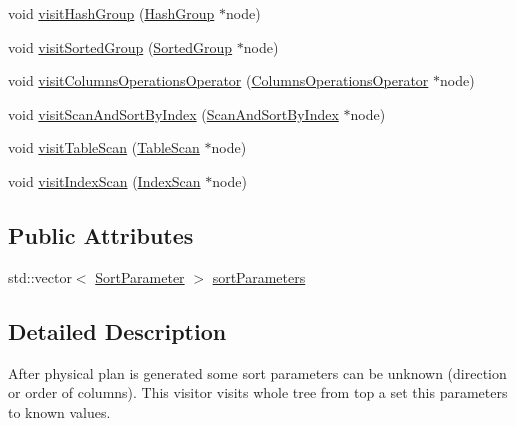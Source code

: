 \begin{DoxyCompactItemize}
\item 
void \hyperlink{classrafe_1_1_sort_resolving_physical_operator_visitor_ab2ed3da0ba8c7ba6c6f57af128b93979}{visit\+Hash\+Group} (\hyperlink{classrafe_1_1_hash_group}{Hash\+Group} $\ast$node)
\item 
void \hyperlink{classrafe_1_1_sort_resolving_physical_operator_visitor_a236a97d59e960a5612758f97342758c8}{visit\+Sorted\+Group} (\hyperlink{classrafe_1_1_sorted_group}{Sorted\+Group} $\ast$node)
\item 
void \hyperlink{classrafe_1_1_sort_resolving_physical_operator_visitor_a6ad430ddefd7a5f9f5a393d76dabc6db}{visit\+Columns\+Operations\+Operator} (\hyperlink{classrafe_1_1_columns_operations_operator}{Columns\+Operations\+Operator} $\ast$node)
\item 
void \hyperlink{classrafe_1_1_sort_resolving_physical_operator_visitor_a14698876ca3eae58a6f40f1e0d0dca13}{visit\+Scan\+And\+Sort\+By\+Index} (\hyperlink{classrafe_1_1_scan_and_sort_by_index}{Scan\+And\+Sort\+By\+Index} $\ast$node)
\item 
void \hyperlink{classrafe_1_1_sort_resolving_physical_operator_visitor_a5d481f69e9982db492fc899693cf1714}{visit\+Table\+Scan} (\hyperlink{classrafe_1_1_table_scan}{Table\+Scan} $\ast$node)
\item 
void \hyperlink{classrafe_1_1_sort_resolving_physical_operator_visitor_a751dc6fc9c39542497d85b866549c895}{visit\+Index\+Scan} (\hyperlink{classrafe_1_1_index_scan}{Index\+Scan} $\ast$node)
\end{DoxyCompactItemize}
\subsection*{Public Attributes}
\begin{DoxyCompactItemize}
\item 
std\+::vector$<$ \hyperlink{classrafe_1_1_sort_parameter}{Sort\+Parameter} $>$ \hyperlink{classrafe_1_1_sort_resolving_physical_operator_visitor_a47bd7f1cd17bf27e8313f77683413929}{sort\+Parameters}
\end{DoxyCompactItemize}


\subsection{Detailed Description}
After physical plan is generated some sort parameters can be unknown (direction or order of columns). This visitor visits whole tree from top a set this parameters to known values. 

